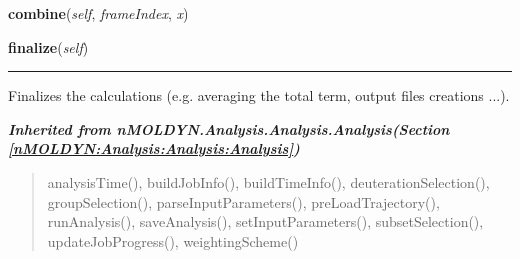     \label{nMOLDYN:Analysis:Structure:PairDistributionFunction:combine}

    \vspace{0.5ex}

\hspace{.8\funcindent}\begin{boxedminipage}{\funcwidth}

    \raggedright \textbf{combine}(\textit{self}, \textit{frameIndex}, \textit{x})

\setlength{\parskip}{2ex}
\setlength{\parskip}{1ex}
    \end{boxedminipage}

    \label{nMOLDYN:Analysis:Structure:PairDistributionFunction:finalize}

    \vspace{0.5ex}

\hspace{.8\funcindent}\begin{boxedminipage}{\funcwidth}

    \raggedright \textbf{finalize}(\textit{self})

    \vspace{-1.5ex}

    \rule{\textwidth}{0.5\fboxrule}
\setlength{\parskip}{2ex}
    Finalizes the calculations (e.g. averaging the total term, output files
    creations ...).

\setlength{\parskip}{1ex}
    \end{boxedminipage}


\large{\textbf{\textit{Inherited from nMOLDYN.Analysis.Analysis.Analysis\textit{(Section \ref{nMOLDYN:Analysis:Analysis:Analysis})}}}}

\begin{quote}
analysisTime(), buildJobInfo(), buildTimeInfo(), deuterationSelection(), groupSelection(), parseInputParameters(), preLoadTrajectory(), runAnalysis(), saveAnalysis(), setInputParameters(), subsetSelection(), updateJobProgress(), weightingScheme()
\end{quote}

